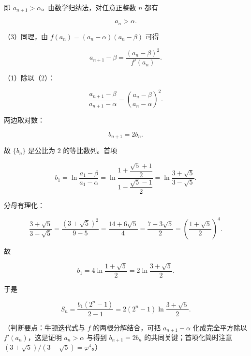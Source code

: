 \begin{answer}
即 $a_{n+1}>\alpha$。由数学归纳法，对任意正整数 $n$ 都有

\nopagebreak[4]
\[a_n>\alpha.\]

（3）同理，由 $f(a_n)=(a_n-\alpha)(a_n-\beta)$ 可得

\nopagebreak[4]
\[a_{n+1}-\beta=\frac{(a_n-\beta)^2}{f'(a_n)}.\tag{2}\]

（1）除以（2）：

\nopagebreak[4]
\[\frac{a_{n+1}-\beta}{a_{n+1}-\alpha}=\left(\frac{a_n-\beta}{a_n-\alpha}\right)^2.\]

两边取对数：

\nopagebreak[4]
\[b_{n+1}=2b_n.\]

故 $\{b_n\}$ 是公比为 $2$ 的等比数列。首项

\nopagebreak[4]
\[b_1=\ln\frac{a_1-\beta}{a_1-\alpha}=\ln\frac{1+\dfrac{\sqrt5+1}{2}}{1-\dfrac{\sqrt5-1}{2}}=\ln\frac{3+\sqrt5}{3-\sqrt5}.\]

分母有理化：

\nopagebreak[4]
\[\frac{3+\sqrt5}{3-\sqrt5}=\frac{(3+\sqrt5)^2}{9-5}=\frac{14+6\sqrt5}{4}=\frac{7+3\sqrt5}{2}=\left(\frac{1+\sqrt5}{2}\right)^4.\]

故

\nopagebreak[4]
\[b_1=4\ln\frac{1+\sqrt5}{2}=2\ln\frac{3+\sqrt5}{2}.\]

于是

\nopagebreak[4]
\[S_n=\frac{b_1(2^n-1)}{2-1}=2(2^n-1)\ln\frac{3+\sqrt5}{2}.\]

（判断要点：牛顿迭代式与 $f$ 的两根分解结合，可把 $a_{n+1}-\alpha$ 化成完全平方除以 $f'(a_n)$，这是证明 $a_n>\alpha$ 与得到 $b_{n+1}=2b_n$ 的共同关键；首项化简时注意 $(3+\sqrt5)/(3-\sqrt5)=\varphi^4$。）


\end{answer}